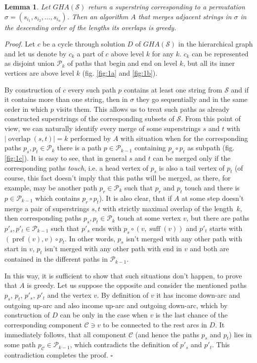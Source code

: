 \documentclass[11pt]{article}
\newtheorem{lem}{Lemma}
\DeclareMathOperator{\suff}{suff}
\DeclareMathOperator{\pref}{pref}
\DeclareMathOperator{\overlap}{overlap}
\begin{document}
	\begin{lem}
		Let $GHA(\mathcal{S})$ return a superstring corresponding to a permutation $\sigma = (s_{i_1}, s_{i_2}, \dots, s_{i_n})$. Then an algorithm $A$ that merges adjacent strings in $\sigma$ in the descending order of the lengths its overlaps is greedy.
	\end{lem}
	{\em Proof.} Let $c$ be a cycle through solution $D$ of $GHA(\mathcal{S})$ in the hierarchical graph and let us denote by $c_k$ a part of $c$ above level $k$ for any $k$. $c_k$ can be represented as disjoint union $\mathcal{P}_k$ of paths that begin and end on level $k$, but all its inner vertices are above level $k$ (fig. \ref{fig:1a} and \ref{fig:1b}).
	
	By construction of $c$ every such path $p$ contains at least one string from $\mathcal{S}$ and if it contains more than one string, then in $\sigma$ they go sequentially and in the same order in which $p$ visits them. This allows us to treat such paths as already constructed superstrings of the corresponding subsets of $\mathcal{S}$. From this point of view, we can naturally identify every merge of  some superstrings $s$ and $t$ with $|\overlap(s,t)| = k$ performed by $A$ with situation when for the corresponding paths $p_s, p_t \in \mathcal{P}_k$ there is a path $p \in \mathcal{P}_{k-1}$ containing $p_s \circ p_t$ as subpath (fig. \ref{fig:1c}). It is easy to see, that in general $s$ and $t$ can be merged only if the corresponding paths {\em touch}, i.e. a head vertex of $p_s$ is also a tail vertex of  $p_t$ (of course, this fact doesn't imply that this paths will be merged, as there, for example, may be another path $p_r \in \mathcal{P}_k$ such that $p_r$ and $p_t$ touch and there is $p \in \mathcal{P}_{k-1}$ which contains $p_r \circ p_t$). It is also clear, that if $A$ at some step doesn't merge a pair of superstrings $s, t$ with strictly maximal overlap of the length~$k$, then corresponding paths $p_s, p_t \in \mathcal{P}_k$ touch at some vertex $v$, but there are paths $p'_s, p'_t \in \mathcal{P}_{k-1}$ such that $p'_s$ ends with $p_s \circ (v, \suff(v))$ and $p'_t$ starts with $(\pref(v), v) \circ p_t$. In other words, $p_s$ isn't merged with any other path with start in $v$, $p_t$ isn't merged with any other path with end in $v$ and both are contained in the different paths in $\mathcal{P}_{k-1}$.
	
	In this way, it is sufficient to show that such situations don't happen, to prove that $A$ is greedy. Let us suppose the opposite and consider the mentioned paths $p_s$, $p_t$, $p'_s$, $p'_t$ and the vertex $v$. By definition of $v$ it has income down-arc and outgoing up-arc and also income up-arc and outgoing down-arc, which by construction of $D$ can be only in the case when $v$ is the last chance of the corresponding component $\mathcal{C} \ni v$ to be connected to the rest arcs in $D$. It immediately follows, that all component $\mathcal{C}$ (and hence the paths  $p_s$ and $p_t$) lies in some path $p_{\mathcal{C}} \in \mathcal{P}_{k-1}$, which contradicts the definition of $p'_s$ and $p'_t$. This contradiction completes the proof. $\square$
	
\end{document}
